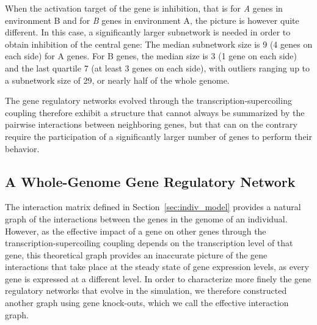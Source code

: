 When the activation target of the gene is inhibition, that is for \emph{A} genes in environment B and for \emph{B} genes in environment A, the picture is however quite different.
In this case, a significantly larger subnetwork is needed in order to obtain inhibition of the central gene: The median subnetwork size is 9 (4 genes on each side) for A genes.
For B genes, the median size is 3 (1 gene on each side) and the last quartile 7 (at least 3 genes on each side), with outliers ranging up to a subnetwork size of 29, or nearly half of the whole genome.

The gene regulatory networks evolved through the transcription-supercoiling coupling therefore exhibit a structure that cannot always be summarized by the pairwise interactions between neighboring genes, but that can on the contrary require the participation of a significantly larger number of genes to perform their behavior.


\subsection{A Whole-Genome Gene Regulatory Network}

The interaction matrix defined in Section~\ref{sec:indiv_model} provides a natural graph of the interactions between the genes in the genome of an individual.
However, as the effective impact of a gene on other genes through the transcription-supercoiling coupling depends on the transcription level of that gene, this theoretical graph provides an inaccurate picture of the gene interactions that take place at the steady state of gene expression levels, as every gene is expressed at a different level.
In order to characterize more finely the gene regulatory networks that evolve in the simulation, we therefore constructed another graph using gene knock-outs, which we call the effective interaction graph.

